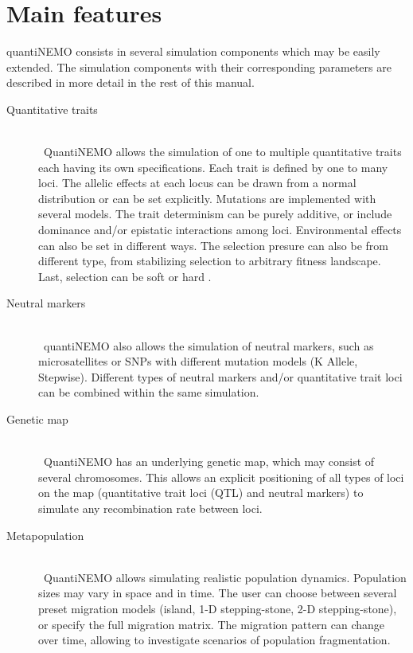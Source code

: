 \documentclass[letterpaper,12pt,oneside]{book}
\begin{document}
\section{Main features}
quantiNEMO consists in several simulation components which may be easily extended. The simulation components with their corresponding parameters are described in more detail in the rest of this manual. 


\begin{description}
\item[Quantitative traits]\hspace*{\fill}\\\
QuantiNEMO allows the simulation of one to multiple quantitative traits each having its own specifications. Each trait is defined by one to many loci. The allelic effects at each locus can be drawn from a normal distribution or can be set explicitly. Mutations are implemented with several models. The trait determinism can be purely additive, or include dominance and/or epistatic interactions among loci. Environmental effects can also be set in different ways. The selection presure can also be from different type, from stabilizing selection to arbitrary fitness landscape. Last, selection can be soft or hard \citep{Wallace_1968}.

\item[Neutral markers]\hspace*{\fill}\\\
quantiNEMO also allows the simulation of neutral markers, such as microsatellites or SNPs with different mutation models (K Allele, Stepwise).
Different types of neutral markers and/or quantitative trait loci can be combined within the same simulation.

\item[Genetic map]\hspace*{\fill}\\\
QuantiNEMO has an underlying genetic map, which may consist of several chromosomes. This allows an explicit positioning of all types of loci on the map (quantitative trait loci (QTL) and neutral markers) to simulate any recombination rate between loci. 

\item[Metapopulation]\hspace*{\fill}\\\
QuantiNEMO allows simulating realistic population dynamics. Population sizes may vary in space and in time. The user can choose between several preset migration models (island, 1-D stepping-stone, 2-D stepping-stone), or specify the full migration matrix. The migration pattern can change over time, allowing to investigate scenarios of population fragmentation.


\end{description}
\end{document}
